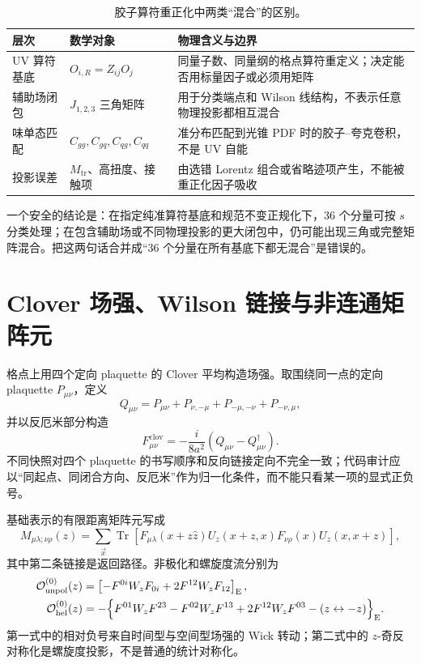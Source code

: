 \begin{table}[H]
  \centering
  \caption{胶子算符重正化中两类“混合”的区别。}
  \label{tab:b05-two-mixings}
  \small
  \begin{tabularx}{\textwidth}{@{}p{}p{}X@{}}
    \toprule
    层次 & 数学对象 & 物理含义与边界 \\
    \midrule
    UV 算符基底 & \(O_{i,R}=Z_{ij}O_j\) & 同量子数、同量纲的格点算符重定义；决定能否用标量因子或必须用矩阵 \\
    辅助场闭包 & \(J_{1,2,3}\) 三角矩阵 & 用于分类端点和 Wilson 线结构，不表示任意物理投影都相互混合 \\
    味单态匹配 & \(C_{gg},C_{gq},C_{qg},C_{qq}\) & 准分布匹配到光锥 PDF 时的胶子--夸克卷积，不是 UV 自能 \\
    投影误差 & \(M_{\mathrm{tr}}\)、高扭度、接触项 & 由选错 Lorentz 组合或省略迹项产生，不能被重正化因子吸收 \\
    \bottomrule
  \end{tabularx}
\end{table}

一个安全的结论是：在指定纯准算符基底和规范不变正规化下，36 个分量可按 \(s\) 分类处理；在包含辅助场或不同物理投影的更大闭包中，仍可能出现三角或完整矩阵混合。把这两句话合并成“36 个分量在所有基底下都无混合”是错误的。

\section{Clover 场强、Wilson 链接与非连通矩阵元}

格点上用四个定向 plaquette 的 Clover 平均构造场强。取围绕同一点的定向 plaquette \(P_{\mu\nu}\)，定义
\begin{equation}
  Q_{\mu\nu}=P_{\mu\nu}+P_{\nu,-\mu}+P_{-\mu,-\nu}+P_{-\nu,\mu},
  \label{eq:b05-clover-sum}
\end{equation}
并以反厄米部分构造
\begin{equation}
  F_{\mu\nu}^{\mathrm{clov}}
  =-\frac{i}{8a^2}\left(Q_{\mu\nu}-Q_{\mu\nu}^{\dagger}\right).
  \label{eq:b05-clover-field}
\end{equation}
不同快照对四个 plaquette 的书写顺序和反向链接定向不完全一致；代码审计应以“同起点、同闭合方向、反厄米”作为归一化条件，而不能只看某一项的显式正负号。

基础表示的有限距离矩阵元写成
\begin{equation}
  M_{\mu\lambda;\nu\rho}(z)
  =\sum_{\vec x}\operatorname{Tr}\!\left[
    F_{\mu\lambda}(x+z\hat z)U_z(x+z,x)
    F_{\nu\rho}(x)U_z(x,x+z)\right],
  \label{eq:b05-lattice-correlator}
\end{equation}
其中第二条链接是返回路径。非极化和螺旋度流分别为
\begin{align}
  \mathcal O_{\mathrm{unpol}}^{(0)}(z)
  &=\left[-F^{0i}W_zF_{0i}+2F^{12}W_zF_{12}\right]_{\mathrm{E}} ,
  \label{eq:b05-lattice-unpol}\\
  \mathcal O_{\mathrm{hel}}^{(0)}(z)
  &=-\Bigl\{F^{01}W_zF^{23}-F^{02}W_zF^{13}
    +2F^{12}W_zF^{03}-(z\leftrightarrow -z)\Bigr\}_{\mathrm{E}} .
  \label{eq:b05-lattice-hel}
\end{align}
第一式中的相对负号来自时间型与空间型场强的 Wick 转动；第二式中的 \(z\)-奇反对称化是螺旋度投影，不是普通的统计对称化。


